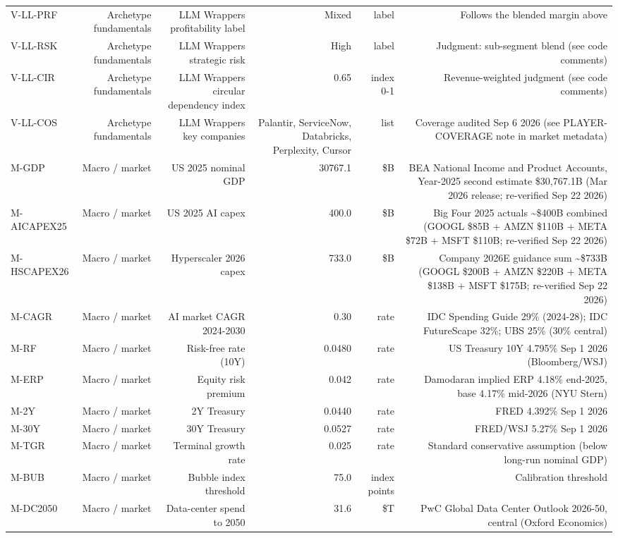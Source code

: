 \begin{tabular}{@{}lrrrrr@{}}
V-LL-PRF & Archetype fundamentals & LLM Wrappers profitability label & Mixed & label & Follows the blended margin above \\
V-LL-RSK & Archetype fundamentals & LLM Wrappers strategic risk & High & label & Judgment: sub-segment blend (see code comments) \\
V-LL-CIR & Archetype fundamentals & LLM Wrappers circular dependency index & 0.65 & index 0-1 & Revenue-weighted judgment (see code comments) \\
V-LL-COS & Archetype fundamentals & LLM Wrappers key companies & Palantir, ServiceNow, Databricks, Perplexity, Cursor & list & Coverage audited Sep 6 2026 (see PLAYER-COVERAGE note in market metadata) \\
M-GDP & Macro / market & US 2025 nominal GDP & 30767.1 & \$B & BEA National Income and Product Accounts, Year-2025 second estimate \$30,767.1B (Mar 2026 release; re-verified Sep 22 2026) \\
M-AICAPEX25 & Macro / market & US 2025 AI capex & 400.0 & \$B & Big Four 2025 actuals \textasciitilde{}\$400B combined (GOOGL \$85B + AMZN \$110B + META \$72B + MSFT \$110B; re-verified Sep 22 2026) \\
M-HSCAPEX26 & Macro / market & Hyperscaler 2026 capex & 733.0 & \$B & Company 2026E guidance sum \textasciitilde{}\$733B (GOOGL \$200B + AMZN \$220B + META \$138B + MSFT \$175B; re-verified Sep 22 2026) \\
M-CAGR & Macro / market & AI market CAGR 2024-2030 & 0.30 & rate & IDC Spending Guide 29\% (2024-28); IDC FutureScape 32\%; UBS 25\% (30\% central) \\
M-RF & Macro / market & Risk-free rate (10Y) & 0.0480 & rate & US Treasury 10Y 4.795\% Sep 1 2026 (Bloomberg/WSJ) \\
M-ERP & Macro / market & Equity risk premium & 0.042 & rate & Damodaran implied ERP 4.18\% end-2025, base 4.17\% mid-2026 (NYU Stern) \\
M-2Y & Macro / market & 2Y Treasury & 0.0440 & rate & FRED 4.392\% Sep 1 2026 \\
M-30Y & Macro / market & 30Y Treasury & 0.0527 & rate & FRED/WSJ 5.27\% Sep 1 2026 \\
M-TGR & Macro / market & Terminal growth rate & 0.025 & rate & Standard conservative assumption (below long-run nominal GDP) \\
M-BUB & Macro / market & Bubble index threshold & 75.0 & index points & Calibration threshold \\
M-DC2050 & Macro / market & Data-center spend to 2050 & 31.6 & \$T & PwC Global Data Center Outlook 2026-50, central (Oxford Economics) \\

\end{tabular}

